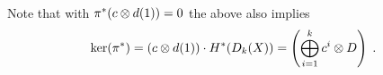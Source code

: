 \begin{Thm}
\begin{enumerate}
\begin{align*}
    \end{align*}
  \end{enumerate}
  Note that with ${\pi}^*(c\otimes d(1)) = 0$ the above also implies
  \begin{gather*}
    \ker({\pi}^*)
    = (c\otimes d(1))\cdot H^*(D_{k}({X}))
    = \left(\bigoplus_{i=1}^k c^i\otimes D\right)
    \;.
  \end{gather*}
\end{Thm}
